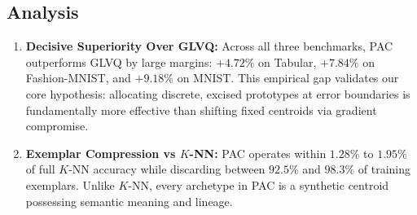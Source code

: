 \documentclass[11pt,a4paper]{article}
\begin{document}
\begin{table}[ht]
\centering
\caption{\textbf{Comparative Classification Performance and Efficiency.} All models trained on identical train/test splits. Wall time measured on CPU.}
\label{tab:benchmarks}
\end{table}

\subsection{Analysis}
\begin{enumerate}
    \item \textbf{Decisive Superiority Over GLVQ:} Across all three benchmarks, PAC outperforms GLVQ by large margins: $+4.72\%$ on Tabular, $+7.84\%$ on Fashion-MNIST, and $+9.18\%$ on MNIST. This empirical gap validates our core hypothesis: allocating discrete, excised prototypes at error boundaries is fundamentally more effective than shifting fixed centroids via gradient compromise.
    \item \textbf{Exemplar Compression vs $K$-NN:} PAC operates within $1.28\%$ to $1.95\%$ of full $K$-NN accuracy while discarding between $92.5\%$ and $98.3\%$ of training exemplars. Unlike $K$-NN, every archetype in PAC is a synthetic centroid possessing semantic meaning and lineage.
\end{enumerate}
\end{document}
